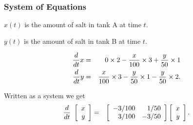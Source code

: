 \begin{frame}
  \frametitle{System of Equations}

  $x(t)$ is the amount of salt in tank A at time $t$.

  $y(t)$ is the amount of salt in tank B at time $t$.

  \begin{eqnarray*}
    \deriv{x}{t} & = & 0\times 2 - 
    \frac{x}{100}\times 3 + \frac{y}{50}\times 1 \\
    \deriv{y}{t} & = & \frac{x}{100} \times 3 -
    \frac{y}{50} \times 1 - \frac{y}{50}\times 2.
  \end{eqnarray*}

  Written as a system we get
  \begin{eqnarray*}
    \deriv{~}{t} \vecTwo{x}{y} & = & 
    \arrayTwo{-3/100}{1/50}{3/100}{-3/50} \vecTwo{x}{y}.
  \end{eqnarray*}
  
\end{frame}


